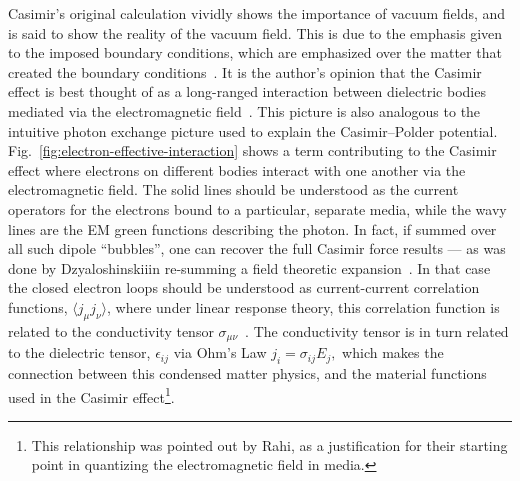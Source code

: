 Casimir's original calculation vividly shows the importance of vacuum fields, and is said to show the reality 
of the vacuum field.  This is due to the emphasis given to the imposed boundary conditions,
which are emphasized over the matter that created the boundary conditions~\cite{Jaffe2005}.  
It is the author's opinion that the Casimir effect is best thought of as a long-ranged interaction between dielectric bodies 
mediated via the electromagnetic field~\cite{Jaffe2005, Rahi2009}.  This picture is also
analogous to the intuitive photon exchange picture used to explain the Casimir--Polder potential.
  Fig.~\ref{fig:electron-effective-interaction} shows a term contributing to the Casimir effect where 
electrons on different bodies interact with one another via the electromagnetic field.
  The solid lines should
be understood as the current operators for the electrons bound to a particular, separate media, while the 
wavy lines are the EM green functions describing the photon.  In fact, if summed over all such dipole ``bubbles'',
one can recover the full Casimir force results --- as was done by Dzyaloshinskii\etal in re-summing a field 
theoretic expansion~\cite{Dzyaloshinskii1961}.  
In that case the closed electron loops should be understood as current-current correlation functions,
$\langle j_\mu j_\nu\rangle$, where under linear response theory, this correlation function is related to the conductivity
tensor $\sigma_{\mu\nu}$~\cite{Kubo1957,Altland2011}.  The conductivity tensor is in turn related to the dielectric tensor, $\epsilon_{ij}$
via Ohm's Law $j_i=\sigma_{ij}E_j,$ which makes the connection between this condensed matter physics,
and the material functions used in the Casimir effect\footnote{
  This relationship was pointed out by Rahi\etal\cite{Rahi2009}, as a justification for their starting point
  in quantizing the electromagnetic field in media.}.


